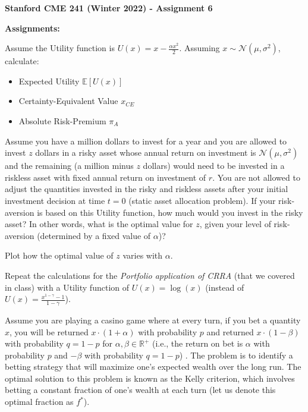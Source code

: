\documentclass[12pt]{exam}
\begin{document}
\begin{center}
{\large {\bf Stanford CME 241 (Winter 2022) - Assignment 6}}
\end{center}
 
{\large{\bf Assignments:}}
\begin{questions}
\question Assume the Utility function is $U(x) = x - \frac {\alpha x^2} 2$. Assuming $x \sim \mathcal{N}(\mu, \sigma^2)$, calculate:
\begin{itemize}
\item Expected Utility $\mathbb{E}[U(x)]$
\item Certainty-Equivalent Value $x_{CE}$
\item Absolute Risk-Premium $\pi_A$	
\end{itemize}
Assume you have a million dollars to invest for a year and you are allowed to invest $z$ dollars in a risky asset whose annual return on investment is $\mathcal{N}(\mu, \sigma^2)$ and the remaining (a million minus $z$ dollars) would need to be invested in a riskless asset with fixed annual return on investment of $r$. You are not allowed to adjust the quantities invested in the risky and riskless assets after your initial investment decision at time $t=0$ (static asset allocation problem). If your risk-aversion is based on this Utility function, how much would you invest in the risky asset? In other words, what is the optimal value for $z$, given your level of risk-aversion (determined by a fixed value of $\alpha$)?

Plot how the optimal value of $z$ varies with $\alpha$.

 Repeat the calculations for the {\em Portfolio application of CRRA} (that we covered in class) with a Utility function of $U(x) = \log(x)$ (instead of $U(x) = \frac {x^{1 - \gamma} - 1} {1 - \gamma}$).

\question Assume you are playing a casino game where at every turn, if you bet a quantity $x$, you will be returned $x \cdot (1 + \alpha)$ with probability $p$ and returned $x \cdot (1 - \beta)$ with probability $q = 1 - p$ for $\alpha, \beta \in \mathbb{R}^+$ (i.e., the return on bet is $\alpha$ with probability $p$ and $-\beta$ with probability $q = 1-p$) . The problem is to identify a betting strategy that will maximize one's expected wealth over the long run. The optimal solution to this problem is known as the Kelly criterion, which involves betting a constant fraction of one's wealth at each turn (let us denote this optimal fraction as $f^*$).


\end{questions}
\end{document}
